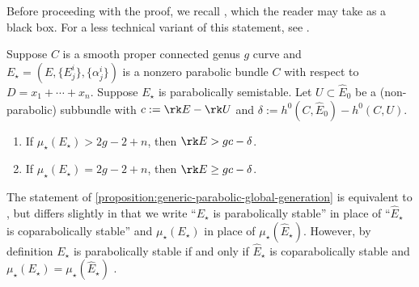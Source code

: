 Before proceeding with the proof, we
recall \cite[Proposition 6.3.6]{LL:geometric-local-systems}, which the
reader may take as a black box.
For a less technical variant of this statement, see
\cite[Proposition 6.3.1]{LL:geometric-local-systems}.
\begin{proposition}
\notready
	\label{proposition:generic-parabolic-global-generation}
	Suppose $C$ is a smooth proper connected genus $g$ curve and
	$E_\star = (E, \{E^i_j\}, \{\alpha^i_j\})$ is a nonzero parabolic bundle $C$
	with respect to $D = x_1 + \cdots + x_n$.
		Suppose $E_\star$ is parabolically semistable.
	Let $U \subset \widehat E_0$ be a (non-parabolic) subbundle with
		$c := \rk E - \rk U$ and
		$\delta := h^0(C, \widehat{E}_0) - h^0(C, U)$.
	\begin{enumerate}
		\item[(I)] If $\mu_\star({E}_\star)> 2g-2 + n$,
		then $\rk E >
			gc - \delta$.
		\item[(II)] If $\mu_\star({E}_\star)= 2g-2+n$, then $\rk
			E \geq gc - \delta$.
	\end{enumerate}
\end{proposition}
\begin{remark}
\notready
\label{remark:}
The statement of \autoref{proposition:generic-parabolic-global-generation} is equivalent to \cite[Proposition
6.3.6]{LL:geometric-local-systems}, but differs slightly in that we write
``$E_\star$ is parabolically stable'' in place of ``$\widehat{E}_\star$ is
coparabolically stable'' and $\mu_\star(E_\star)$ in place of
$\mu_\star(\widehat{E}_\star)$.
However, by definition
$E_\star$ is parabolically stable if and only if $\widehat{E}_\star$ is
coparabolically stable and $\mu_\star(E_\star) = \mu_\star(\widehat{E}_\star)$
\cite[Definitions 2.2.9 and 2.4.2]{LL:geometric-local-systems}.
\end{remark}


